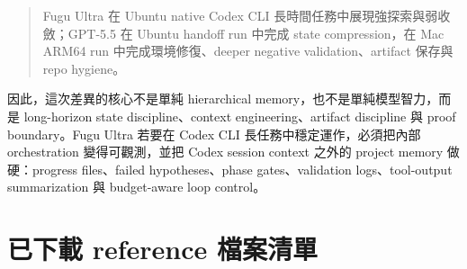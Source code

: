 \documentclass[UTF8,a4paper,11pt]{ctexart}
\begin{document}
\begin{quote}
Fugu Ultra 在 Ubuntu native Codex CLI 長時間任務中展現強探索與弱收斂；GPT-5.5 在 Ubuntu handoff run 中完成 state compression，在 Mac ARM64 run 中完成環境修復、deeper negative validation、artifact 保存與 repo hygiene。
\end{quote}

因此，這次差異的核心不是單純 hierarchical memory，也不是單純模型智力，而是 long-horizon state discipline、context engineering、artifact discipline 與 proof boundary。Fugu Ultra 若要在 Codex CLI 長任務中穩定運作，必須把內部 orchestration 變得可觀測，並把 Codex session context 之外的 project memory 做硬：progress files、failed hypotheses、phase gates、validation logs、tool-output summarization 與 budget-aware loop control。

\appendix
\section{已下載 reference 檔案清單}
\end{document}
